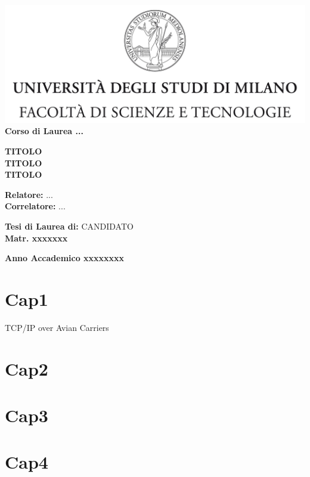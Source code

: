 \documentclass[12pt,a4paper]{report}
\begin{document}
\begin{titlepage}
\begin{center}
\includegraphics[width=\textwidth]{Logo.jpg}\\
{\large{\bf Corso di Laurea ...}}
\end{center}
\vspace{12mm}
\begin{center}
{\huge{\bf TITOLO}}\\
\vspace{4mm}
{\huge{\bf TITOLO}}\\
\vspace{4mm}
{\huge{\bf TITOLO}}\\
\end{center}
\vspace{12mm}
\begin{flushleft}
{\large{\bf Relatore:}}
{\large{...}}\\
\vspace{4mm}
{\large{\bf Correlatore:}}
{\large{...}}\\
\end{flushleft}
\vspace{12mm}
\begin{flushright}
{\large{\bf Tesi di Laurea di:}}
{\large{CANDIDATO}}\\
{\large{\bf Matr. xxxxxxx}}\\
\end{flushright}
\vspace{4mm}
\begin{center}
{\large{\bf Anno Accademico xxxxxxxx}}
\end{center}
\end{titlepage}


\tableofcontents


\chapter{Cap1}

TCP/IP over Avian Carriers\cite{waitzman1990standard}

\chapter{Cap2}
\chapter{Cap3}
\chapter{Cap4}




\end{document}
